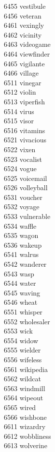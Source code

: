 6455 vestibule \\
6456 veteran \\
6461 vexingly \\
6462 vicinity \\
6463 videogame \\
6464 viewfinder \\
6465 vigilante \\
6466 village \\
6511 vinegar \\
6512 violin \\
6513 viperfish \\
6514 virus \\
6515 visor \\
6516 vitamins \\
6521 vivacious \\
6522 vixen \\
6523 vocalist \\
6524 vogue \\
6525 voicemail \\
6526 volleyball \\
6531 voucher \\
6532 voyage \\
6533 vulnerable \\
6534 waffle \\
6535 wagon \\
6536 wakeup \\
6541 walrus \\
6542 wanderer \\
6543 wasp \\
6544 water \\
6545 waving \\
6546 wheat \\
6551 whisper \\
6552 wholesaler \\
6553 wick \\
6554 widow \\
6555 wielder \\
6556 wifeless \\
6561 wikipedia \\
6562 wildcat \\
6563 windmill \\
6564 wipeout \\
6565 wired \\
6566 wishbone \\
6611 wizardry \\
6612 wobbliness \\
6613 wolverine \\
